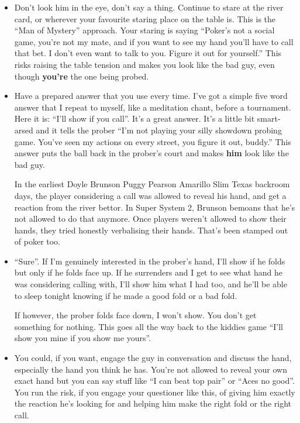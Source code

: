 \begin{itemize}
  \item Don't look him in the eye, don't say a thing. Continue to
    stare at the river card, or wherever your favourite staring place
    on the table is. This is the ``Man of Mystery'' approach. Your
    staring is saying ``Poker's not a social game, you're not my
    mate, and if you want to see my hand you'll have to call that
    bet. I don't even want to talk to you. Figure it out for
    yourself.'' This risks raising the table tension and makes you
    look like the bad guy, even though \textbf{you're} the one being
    probed.

  \item Have a prepared answer that you use every time. I've got a
    simple five word answer that I repeat to myself, like a meditation
    chant, before a tournament. Here it is: ``I'll show if you
    call''. It's a great answer. It's a little bit smart-arsed and it
    tells the prober ``I'm not playing your silly showdown probing
    game. You've seen my actions on every street, you figure it out,
    buddy.'' This answer puts the ball back in the prober's court and
    makes \textbf{him} look like the bad guy.

  In the earliest Doyle Brunson Puggy Pearson Amarillo Slim Texas
  backroom days, the player considering a call was allowed to reveal
  his hand, and get a reaction from the river bettor. In Super System
  2, Brunson bemoans that he's not allowed to do that anymore.
  Once players weren't allowed to show their hands, they tried
  honestly verbalising their hands. That's been stamped out of poker
  too.

  \item ``Sure''. If I'm genuinely interested in the prober's hand,
    I'll show if he folds but only if he folds face up. If he
    surrenders and I get to see what hand he was considering calling
    with, I'll show him what I had too, and he'll be able to sleep
    tonight knowing if he made a good fold or a bad fold.

    If however, the prober folds face down, I won't show. You don't
    get something for nothing. This goes all the way back to the
    kiddies game ``I'll show you mine if you show me yours''.

  \item You could, if you want, engage the guy in conversation and
    discuss the hand, especially the hand you think he has. You're not
    allowed to reveal your own exact hand but you can say stuff like
    ``I can beat top pair'' or ``Aces no good''. You run the risk, if
    you engage your questioner like this, of giving him exactly the
    reaction he's looking for and helping him make the right
    fold or the right call.


\end{itemize}
